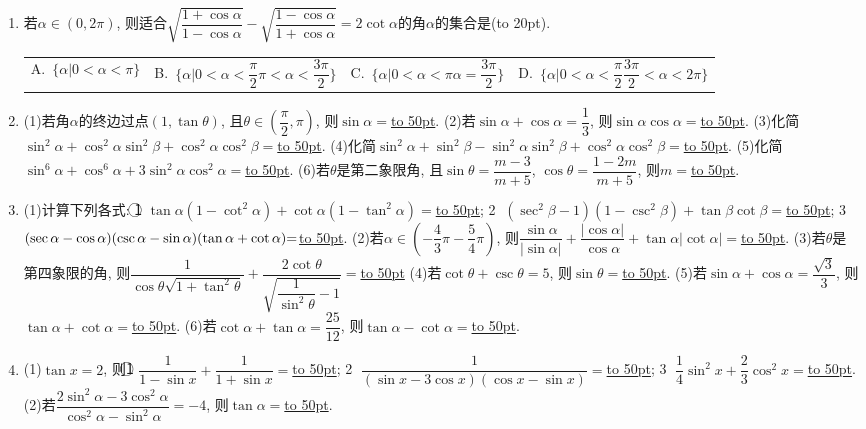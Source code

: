 \documentclass[10pt,a4paper]{article}
\newcommand{\blank}[1]{\underline{\hbox to #1pt{}}}
\newcommand{\bracket}[1]{(\hbox to #1pt{})}
\newcommand{\fourch}[4]{\par\begin{tabular}{p{.23\textwidth}p{.23\textwidth}p{.23\textwidth}p{.23\textwidth}}
A.~#1 &B.~#2& C.~#3& D.~#4
\end{tabular}}
\begin{document}
\begin{enumerate}[1.]
\fourch{$2k\pi +\dfrac{\pi }2<x<2k\pi +\dfrac{3\pi }2$($k\in \mathbf{Z}$)}{$k\pi +\dfrac{\pi }2<x<k\pi +\dfrac{3\pi }2$($k\in \mathbf{Z}$)}{$2k\pi <x<2k\pi +\pi$($k\in \mathbf{Z}$)}{$2k\pi -\dfrac{\pi }2<x<2k\pi +\dfrac{\pi }2$($k\in \mathbf{Z}$)}
\item 若$\alpha \in (0,2\pi)$, 则适合$\sqrt {\dfrac{1+\cos \alpha }{1-\cos \alpha }}-\sqrt {\dfrac{1-\cos \alpha }{1+\cos \alpha }}=2\cot \alpha$的角$\alpha$的集合是\bracket{20}.
\fourch{$\{\alpha|0<\alpha <\pi\}$}{$\{\alpha|0<\alpha <\dfrac{\pi }2\pi <\alpha <\dfrac{3\pi }2\}$}{$\{\alpha|0<\alpha <\pi \alpha =\dfrac{3\pi }2\}$}{$\{\alpha|0<\alpha <\dfrac{\pi }2\dfrac{3\pi }2<\alpha <2\pi\}$}
\item (1)若角$\alpha$的终边过点$(1,\tan \theta)$, 且$\theta \in (\dfrac{\pi }2,\pi)$, 则$\sin \alpha =$\blank{50}.
(2)若$\sin \alpha +\cos \alpha =\dfrac 13$, 则$\sin \alpha \cos \alpha =$\blank{50}.
(3)化简$\sin ^2\alpha +\cos ^2\alpha \sin ^2\beta +\cos ^2\alpha \cos ^2\beta =$\blank{50}.
(4)化简$\sin ^2\alpha +\sin ^2\beta -\sin ^2\alpha \sin ^2\beta +\cos ^2\alpha \cos ^2\beta =$\blank{50}.
(5)化简$\sin ^6\alpha +\cos ^6\alpha +3\sin ^2\alpha \cos ^2\alpha =$\blank{50}.
(6)若$\theta$是第二象限角, 且$\sin \theta =\dfrac{m-3}{m+5}$, $\cos \theta =\dfrac{1-2m}{m+5}$, 则$m=$\blank{50}.
\item (1)计算下列各式:
\textcircled{1} $\tan \alpha (1-\cot ^2\alpha)+\cot \alpha (1-\tan ^2\alpha)=$\blank{50};
\textcircled{2} $(\sec ^2\beta -1)(1-\csc ^2\beta)+\tan \beta \cot \beta =$\blank{50};
\textcircled{3} $(\sec \alpha -\cos \alpha)(\csc \alpha -\sin \alpha)(\tan \alpha +\cot \alpha)\text=$\blank{50}.
(2)若$\alpha \in (-\dfrac 43\pi -\dfrac 54\pi)$, 则$\dfrac{\sin \alpha }{|\sin \alpha|}+\dfrac{|\cos \alpha|}{\cos \alpha }+\tan \alpha|\cot \alpha|=$\blank{50}.
(3)若$\theta$是第四象限的角, 则$\dfrac 1{\cos \theta \sqrt {1+\tan ^2\theta }}+\dfrac{2\cot \theta }{\sqrt {\dfrac 1{\sin ^2\theta }-1}}=$\blank{50}
(4)若$\cot \theta +\csc \theta =5$, 则$\sin \theta =$\blank{50}.
(5)若$\sin \alpha +\cos \alpha =\dfrac{\sqrt 3}3$, 则$\tan \alpha +\cot \alpha =$\blank{50}.
(6)若$\cot \alpha +\tan \alpha =\dfrac{25}{12}$, 则$\tan \alpha -\cot \alpha =$\blank{50}.
\item (1)$\tan x=2$, 则\textcircled{1} $\dfrac 1{1-\sin x}+\dfrac 1{1+\sin x}=$\blank{50};
\textcircled{2} $\dfrac 1{(\sin x-3\cos x)(\cos x-\sin x)}=$\blank{50};
\textcircled{3} $\dfrac 14\sin ^2x+\dfrac 23\cos ^2x=$\blank{50}.
(2)若$\dfrac{2\sin ^2\alpha -3\cos ^2\alpha }{\cos ^2\alpha -\sin ^2\alpha }=-4$, 则$\tan \alpha =$\blank{50}.

\end{enumerate}
\end{document}
